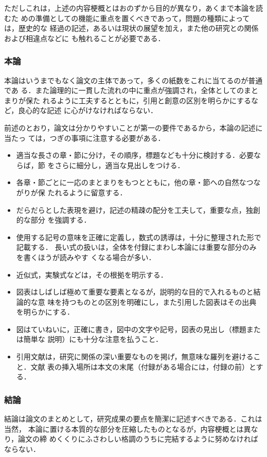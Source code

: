 \documentclass[master]{kuisthesis}		%
\begin{document}
ただしこれは，上述の内容梗概とはおのずから目的が異なり，あくまで本論を読むた
めの準備としての機能に重点を置くべきであって，問題の種類によっては，歴史的な
経過の記述，あるいは現状の展望を加え，また他の研究との関係および相違点などに
も触れることが必要である．

\subsubsection{本論}\label{subsubsec-main}
本論はいうまでもなく論文の主体であって，多くの紙数をこれに当てるのが普通であ
る．また論理的に一貫した流れの中に重点が強調され，全体としてのまとまりが保た
れるように工夫するとともに，引用と創意の区別を明らかにするなど，良心的な記述
に心がけなければならない．

前述のとおり，論文は分かりやすいことが第一の要件であるから，本論の記述に当たっ
ては，つぎの事項に注意する必要がある．
\begin{itemize}%
\item
適当な長さの章・節に分け，その順序，標題なども十分に検討する．必要ならば，節
をさらに細分し，適当な見出しをつける．
\item
各章・節ごとに一応のまとまりをもつとともに，他の章・節への自然なつながりが保
たれるように留意する．
\item
だらだらとした表現を避け，記述の精疎の配分を工夫して，重要な点，独創的な部分
を強調する．
\item
使用する記号の意味を正確に定義し，数式の誘導は，十分に整理された形で記載する．
長い式の扱いは，全体を付録にまわし本論には重要な部分のみを書くほうが読みやす
くなる場合が多い．
\item
近似式，実験式などは，その根拠を明示する．
\item
図表はしばしば極めて重要な要素となるが，説明的な目的で入れるものと結論的な意
味を持つものとの区別を明確にし，また引用した図表はその出典を明らかにする．
\item
図はていねいに，正確に書き，図中の文字や記号，図表の見出し（標題または簡単な
説明）にも十分な注意を払うこと．
\item
引用文献は，研究に関係の深い重要なものを掲げ，無意味な羅列を避けること．文献
表の挿入場所は本文の末尾（付録がある場合には，付録の前）とする．
\end{itemize}%

\subsubsection{結論}\label{subsubsec-conclusion}
結論は論文のまとめとして，研究成果の要点を簡潔に記述すべきである．これは当然，
本論に置ける本質的な部分を圧縮したものとなるが，内容梗概とは異なり，論文の締
めくくりにふさわしい格調のうちに完結するように努めなければならない．
\end{document}
